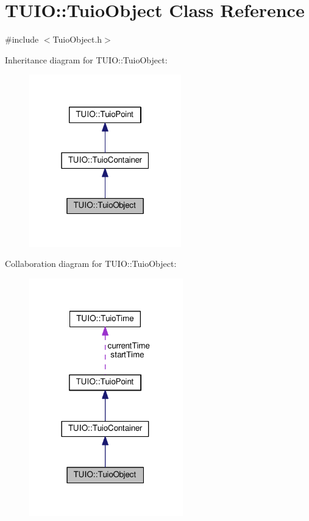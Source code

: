 \hypertarget{class_t_u_i_o_1_1_tuio_object}{}\section{T\+U\+IO\+:\+:Tuio\+Object Class Reference}
\label{class_t_u_i_o_1_1_tuio_object}


{\ttfamily \#include $<$Tuio\+Object.\+h$>$}



Inheritance diagram for T\+U\+IO\+:\+:Tuio\+Object\+:\nopagebreak
\begin{figure}[H]
\begin{center}
\leavevmode
\includegraphics[width=187pt]{class_t_u_i_o_1_1_tuio_object__inherit__graph}
\end{center}
\end{figure}


Collaboration diagram for T\+U\+IO\+:\+:Tuio\+Object\+:\nopagebreak
\begin{figure}[H]
\begin{center}
\leavevmode
\includegraphics[width=189pt]{class_t_u_i_o_1_1_tuio_object__coll__graph}
\end{center}
\end{figure}
